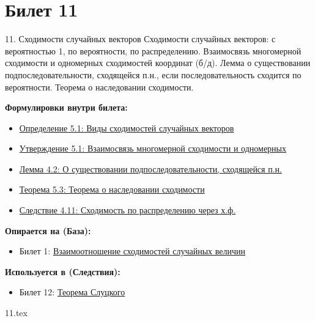 \documentclass[a4paper, 12pt]{article}
\newcommand{\ticketsection}[1]{\vspace{0.5em}\noindent\textbf{\textcolor{ticketdark}{\sffamily #1}}\par}
\begin{document}
\section{Билет 11}
\begin{ticketskeleton}{11. Сходимости случайных векторов}
     Сходимости случайных векторов: с вероятностью 1, по вероятности, по распределению. Взаимосвязь многомерной сходимости и одномерных сходимостей координат (б/д). Лемма о существовании подпоследовательности, сходящейся п.н., если последовательность сходится по вероятности. Теорема о наследовании сходимости.

    \ticketsection{Формулировки внутри билета:}
    \begin{itemize}
        \item \hyperref[def:vector_conv]{Определение 5.1: Виды сходимостей случайных векторов}
        \item \hyperref[prop:vector_comp]{Утверждение 5.1: Взаимосвязь многомерной сходимости и одномерных}
        \item \hyperref[lem:subseq_prob]{Лемма 4.2: О существовании подпоследовательности, сходящейся п.н.}
        \item \hyperref[thm:cont_mapping]{Теорема 5.3: Теорема о наследовании сходимости}
        \item \hyperref[cor:conv_char]{Следствие 4.11: Сходимость по распределению через х.ф.}
    \end{itemize}

    \ticketsection{Опирается на (База):}
    \begin{itemize}
        \item Билет 1: \hyperref[thm:conv_rel]{Взаимоотношение сходимостей случайных величин}
    \end{itemize}

    \ticketsection{Используется в (Следствия):}
    \begin{itemize}
        \item Билет 12: \hyperref[thm:slutsky_gen]{Теорема Слуцкого}
    \end{itemize}
\end{ticketskeleton}

{11.tex}
\end{document}
